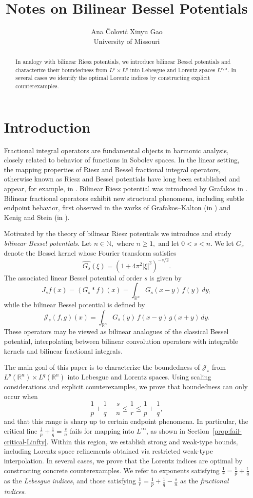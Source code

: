\documentclass[12pt]{article}
\title{Notes on Bilinear Bessel Potentials}
\author{Ana Čolović \qquad Xinyu Gao\\University of Missouri}
\theoremstyle{definition}
\theoremstyle{remark}
\numberwithin{equation}{section}
\begin{document}
\maketitle

\begin{abstract}
In analogy with bilinear Riesz potentials, we introduce bilinear Bessel potentials and characterize their boundedness from $L^p\times L^q$
 into Lebesgue and Lorentz spaces $L^{r,\alpha}.$ In several cases we identify the optimal Lorentz indices by constructing explicit counterexamples.
\end{abstract}

\section{Introduction}

Fractional integral operators are fundamental objects in harmonic analysis,
closely related to behavior of functions in Sobolev spaces. In the linear setting,
the mapping properties of Riesz and Bessel fractional integral operators, otherwise known as Riesz and Bessel potentials have long been established and appear, for example, in \cite{Ste}. Bilinear Riesz potential was introduced by Grafakos in \cite{GraSt}. Bilinear fractional operators exhibit new structural phenomena, including subtle endpoint behavior, first observed in the works of Grafakos–Kalton (in \cite{GraKal}) and Kenig and Stein (in \cite{KenSte}).


Motivated by the theory of bilinear Riesz potentials we introduce and study \emph{bilinear Bessel potentials}. Let $n\in \mathbb{N},$ where $n\geq 1,$ and let $0<s<n$.
We let $G_s$ denote the Bessel kernel whose Fourier transform satisfies
\[
\widehat{G_s}(\xi)=(1+4\pi^2|\xi|^2)^{-s/2}.
\]
The associated linear Bessel potential of order $s$ is given by
\[
J_s f(x)
=
(G_s * f)(x)
=
\int_{\mathbb R^n} G_s(x-y)\,f(y)\,dy,
\]
while the bilinear Bessel potential is defined by
\[
\mathcal J_s(f,g)(x)
=
\int_{\mathbb R^n} G_s(y)\,f(x-y)\,g(x+y)\,dy.
\]
These operators may be viewed as bilinear analogues of the classical Bessel
potential, interpolating between bilinear convolution operators with
integrable kernels and bilinear fractional integrals. 

The main goal of this paper is to characterize the boundedness of
$\mathcal J_s$ from
$L^p(\mathbb R^n)\times L^q(\mathbb R^n)$ into Lebesgue and Lorentz spaces.
Using scaling considerations and explicit counterexamples, we prove that
boundedness can only occur when
\[
\frac1p+\frac1q-\frac{s}{n}\le \frac1r\le \frac1p+\frac1q,
\]
and that this range is sharp up to certain endpoint phenomena. In particular,
the critical line $\frac1p+\frac1q=\frac{s}{n}$ fails for mapping into
$L^\infty$, as shown in Section~\ref{prop:fail-critical-Linfty}. Within this region, we establish strong and
weak-type bounds, including Lorentz space refinements obtained via restricted
weak-type interpolation. In several cases, we prove that the Lorentz indices
are optimal by constructing concrete counterexamples. We refer to exponents satisfying
$\frac1r=\frac1p+\frac1q$
as the \emph{Lebesgue indices}, and those satisfying
$\frac1r=\frac1p+\frac1q-\frac{s}{n}$
as the \emph{fractional indices}.
\end{document}
